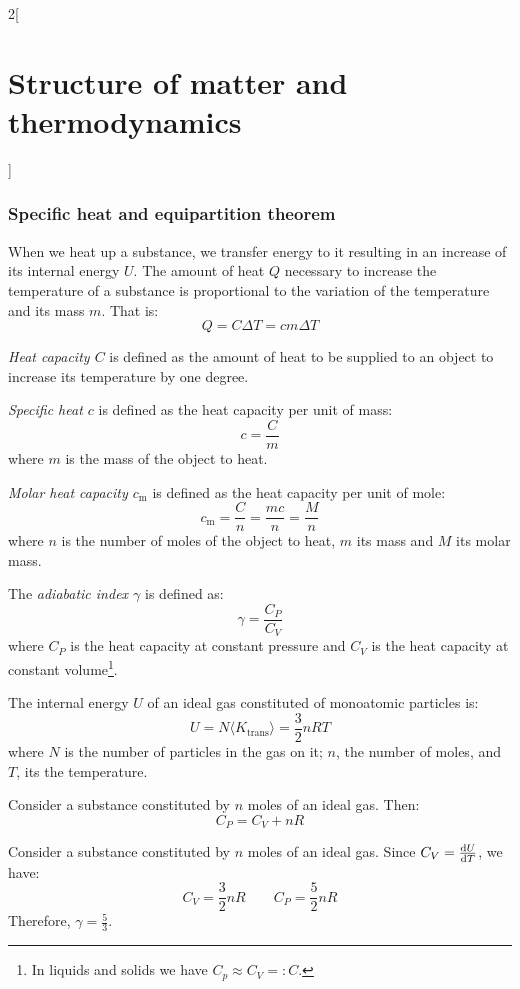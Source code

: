 \documentclass[../../../main.tex]{subfiles}
\begin{document}
\begin{multicols}{2}[\section{Structure of matter and thermodynamics}]
  \subsubsection{Specific heat and equipartition theorem}
  \begin{definition}
    When we heat up a substance, we transfer energy to it resulting in an increase of its internal energy $U$. The amount of heat $Q$ necessary to increase the temperature of a substance is proportional to the variation of the temperature and its mass $m$. That is:
    $$Q=C\Delta T=cm\Delta T$$
  \end{definition}
  \begin{definition}
    \textit{Heat capacity $C$} is defined as the amount of heat to be supplied to an object to increase its temperature by one degree.
  \end{definition}
  \begin{definition}
    \textit{Specific heat $c$} is defined as the heat capacity per unit of mass: $$c=\frac{C}{m}$$ where $m$ is the mass of the object to heat.
  \end{definition}
  \begin{definition}
    \textit{Molar heat capacity $c_\text{m}$} is defined as the heat capacity per unit of mole: $$c_\text{m}=\frac{C}{n}=\frac{mc}{n}=\frac{M}{n}$$ where $n$ is the number of moles of the object to heat, $m$ its mass and $M$ its molar mass.
  \end{definition}
  \begin{definition}
    The \textit{adiabatic index $\gamma$} is defined as:
    $$\gamma=\frac{C_P}{C_V}$$
    where $C_P$ is the heat capacity at constant pressure and $C_V$ is the heat capacity at constant volume\footnote{In liquids and solids we have $C_p\approx C_V=:C$.}.
  \end{definition}
  \begin{definition}
    The internal energy $U$ of an ideal gas constituted of monoatomic particles is:
    $$U=N\langle K_\text{trans}\rangle=\frac{3}{2}nRT$$
    where $N$ is the number of particles in the gas on it; $n$, the number of moles, and $T$, its the temperature.
  \end{definition}
  \begin{prop}
    Consider a substance constituted by $n$ moles of an ideal gas. Then:
    $$C_P=C_V+nR$$
  \end{prop}
  \begin{prop}
    Consider a substance constituted by $n$ moles of an ideal gas. Since $C_V=\dv{U}{T}$, we have: $$C_V=\frac{3}{2}nR\qquad C_P=\frac{5}{2}nR$$ Therefore, $\gamma=\frac{5}{3}$.

\end{prop}
\end{multicols}
\end{document}
